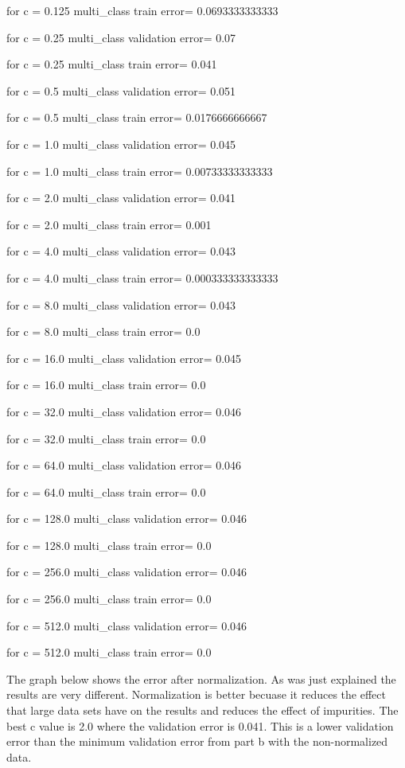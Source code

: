 \documentclass[12pt]{article}
\begin{document}
\begin{enumerate}
for c = 0.125 multi\_class train error= 0.0693333333333

for c = 0.25 multi\_class validation error= 0.07

for c = 0.25 multi\_class train error= 0.041

for c = 0.5 multi\_class validation error= 0.051

for c = 0.5 multi\_class train error= 0.0176666666667

for c = 1.0 multi\_class validation error= 0.045

for c = 1.0 multi\_class train error= 0.00733333333333

for c = 2.0 multi\_class validation error= 0.041

for c = 2.0 multi\_class train error= 0.001

for c = 4.0 multi\_class validation error= 0.043

for c = 4.0 multi\_class train error= 0.000333333333333

for c = 8.0 multi\_class validation error= 0.043

for c = 8.0 multi\_class train error= 0.0

for c = 16.0 multi\_class validation error= 0.045

for c = 16.0 multi\_class train error= 0.0

for c = 32.0 multi\_class validation error= 0.046

for c = 32.0 multi\_class train error= 0.0

for c = 64.0 multi\_class validation error= 0.046

for c = 64.0 multi\_class train error= 0.0

for c = 128.0 multi\_class validation error= 0.046

for c = 128.0 multi\_class train error= 0.0

for c = 256.0 multi\_class validation error= 0.046

for c = 256.0 multi\_class train error= 0.0

for c = 512.0 multi\_class validation error= 0.046

for c = 512.0 multi\_class train error= 0.0

The graph below shows the error after normalization. As was just explained the results are very different. Normalization is better becuase it reduces the effect that large data sets have on the results and reduces the effect of impurities. The best c value is 2.0 where the validation error is 0.041. This is a lower validation error than the minimum validation error from part b with the non-normalized data. 


\end{enumerate}
\end{document}

